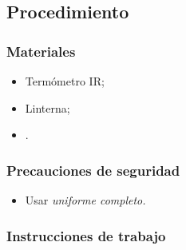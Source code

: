 \subsection{Procedimiento}

\subsubsection{Materiales}
\begin{itemize}
	\item Termómetro IR;\@
	\item Linterna;\@
	\item \Oent.
\end{itemize}

\subsubsection{Precauciones de seguridad}

\begin{itemize}
	\item Usar \emph{uniforme completo.}
\end{itemize}

\subsubsection{Instrucciones de trabajo}


